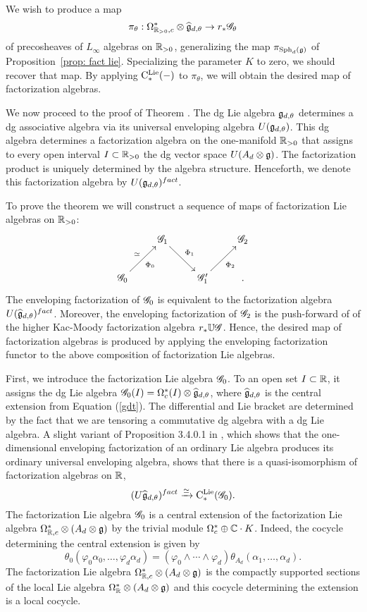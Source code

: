 
We wish to produce a map 
\[
\pi_\theta: \Omega^*_{\mathbb R_{>0},c} \otimes \widehat{\mathfrak g}_{d,\theta} \to r_* \mathscr G_\theta
\]
of precosheaves of $L_\infty$ algebras on $\mathbb R_{>0}$,
generalizing the map $\pi_{{\rm Sph}_d(\mathfrak g)}$ of Proposition~\ref{prop: fact lie}.
Specializing the parameter $K$ to zero, we should recover that map.
By applying ${\rm C}^{\rm Lie}_*(-)$ to $\pi_\theta$, we will obtain the desired map of factorization algebras. 

We now proceed to the proof of Theorem \label{thm sphere alg}. 
The dg Lie algebra $\mathfrak g_{d,\theta}$ determines a dg associative algebra via its universal enveloping algebra $U(\mathfrak g_{d,\theta})$.
This dg algebra determines a factorization algebra on the one-manifold $\mathbb R_{>0}$ that assigns to every open interval $I \subset \mathbb R_{>0}$ the dg vector space $U(A_d \otimes \mathfrak g)$. 
The factorization product is uniquely determined by the algebra structure. 
Henceforth, we denote this factorization algebra by $U(\mathfrak g_{d,\theta})^{fact}$.

To prove the theorem we will construct a sequence of maps of factorization Lie algebras on $\mathbb R_{>0}$:
\[
\xymatrix{
& \sG_1 \ar[dr]^-{\Phi_1} & & \sG_2 \\
\sG_0 \ar[ur]^-{\simeq}_{\Phi_0} & & \sG_1' \ar[ur]_{\Phi_2} & .
}
\]
The enveloping factorization of $\mathscr G_0$ is equivalent to the factorization algebra $U (\widehat{\mathfrak g}_{d,\theta})^{fact}$. 
Moreover, the enveloping factorization of $\mathscr G_2$ is the push-forward of of the higher Kac-Moody factorization algebra $r_* \mathbb U \mathscr G$. 
Hence, the desired map of factorization algebras is produced by applying the enveloping factorization functor to the above composition of factorization Lie algebras. 

First, we introduce the factorization Lie algebra $\mathscr G_0$. 
To an open set $I \subset \mathbb R$, it assigns the dg Lie algebra $\mathscr G_0(I) = \Omega^*_{c}(I) \otimes \widehat{\mathfrak g}_{d,\theta}$, where $\widehat{\mathfrak g}_{d,\theta}$ is the central extension from Equation (\ref{gdt}). The differential and Lie bracket are determined by the fact that we are tensoring a commutative dg algebra with a dg Lie algebra. A slight variant of Proposition 3.4.0.1 in \cite{CG1}, which shows that the one-dimensional enveloping factorization of an ordinary Lie algebra produces its ordinary universal enveloping algebra, shows that there is a quasi-isomorphism of factorization algebras on $\mathbb R$,
\[
(U \widehat{\mathfrak g}_{d,\theta})^{fact} \xrightarrow{\simeq} {\rm C}^{\rm Lie}_*(\mathscr G_0) .
\]
The factorization Lie algebra $\mathscr G_0$ is a central extension of the factorization Lie algebra $\Omega^*_{\mathbb R,c} \otimes (A_d \otimes \mathfrak g)$ by the trivial module $\Omega^*_c \oplus \mathbb C \cdot K$. Indeed, the cocycle determining the central extension is given by
\[
\theta_0 (\varphi_0 \alpha_0,\ldots,\varphi_d \alpha_d) = (\varphi_0 \wedge \cdots \wedge \varphi_d) \theta_{A_d}(\alpha_1,\ldots,\alpha_d) .
\] 
The factorization Lie algebra $\Omega^*_{\mathbb R,c} \otimes (A_d \otimes \mathfrak g)$ is the compactly supported sections of the local Lie algebra $\Omega^*_{\mathbb R} \otimes (A_d \otimes \mathfrak g)$ and this cocycle determining the extension is a local cocycle. 

